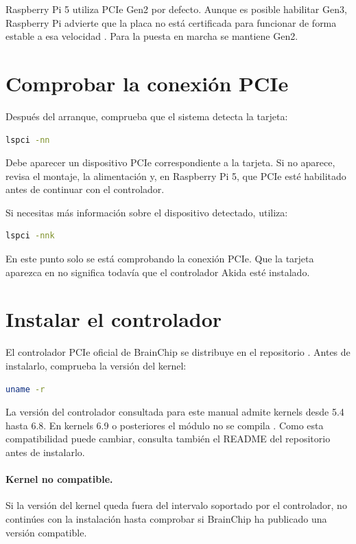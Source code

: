 Raspberry Pi 5 utiliza PCIe Gen2 por defecto. Aunque es posible habilitar Gen3,
Raspberry Pi advierte que la placa no está certificada para funcionar de forma estable
a esa velocidad \cite{rpi_pcie}. Para la puesta en marcha se mantiene Gen2.

\section{Comprobar la conexión PCIe}

Después del arranque, comprueba que el sistema detecta la tarjeta:

\begin{lstlisting}[language=bash]
lspci -nn
\end{lstlisting}

Debe aparecer un dispositivo PCIe correspondiente a la tarjeta. Si no aparece, revisa
el montaje, la alimentación y, en Raspberry Pi 5, que PCIe esté habilitado antes de
continuar con el controlador.

Si necesitas más información sobre el dispositivo detectado, utiliza:

\begin{lstlisting}[language=bash]
lspci -nnk
\end{lstlisting}

En este punto solo se está comprobando la conexión PCIe. Que la tarjeta aparezca en
 no significa todavía que el controlador Akida esté instalado.

\section{Instalar el controlador}

El controlador PCIe oficial de BrainChip se distribuye en el repositorio
. Antes de instalarlo, comprueba la versión del kernel:

\begin{lstlisting}[language=bash]
uname -r
\end{lstlisting}

La versión del controlador consultada para este manual admite kernels desde 5.4 hasta
6.8. En kernels 6.9 o posteriores el módulo no se compila \cite{brainchip_driver}.
Como esta compatibilidad puede cambiar, consulta también el README del
repositorio antes de instalarlo.

\paragraph{Kernel no compatible.}
Si la versión del kernel queda fuera del intervalo soportado por el controlador,
no continúes con la instalación hasta comprobar si BrainChip ha publicado una versión
compatible.


